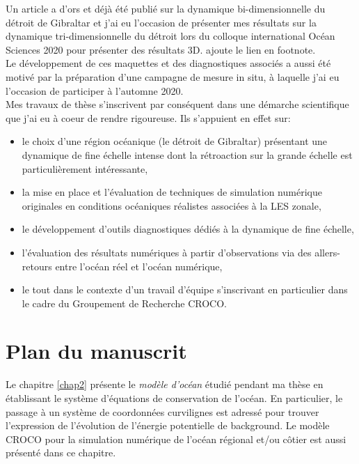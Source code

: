 Un article a d'ors et déjà été publié sur la dynamique bi-dimensionnelle du détroit de Gibraltar \citep{hilt_2020} et j'ai eu l'occasion de présenter mes résultats sur la dynamique tri-dimensionnelle du détroit lors du colloque international Océan Sciences 2020 pour présenter des résultats 3D.
\color{green} ajoute le lien en footnote.\color{black}\\

Le développement de ces maquettes et des diagnostiques associés a aussi été motivé par la préparation d'une campagne de mesure in situ, à laquelle j'ai eu l'occasion de participer à l'automne 2020. \\

\color{green}
Mes travaux de thèse s'inscrivent par conséquent dans une démarche scientifique que j'ai eu à coeur de rendre rigoureuse. Ils s'appuient en effet sur:
\begin{itemize}
    \item le choix d'une région océanique (le détroit de Gibraltar) présentant une dynamique de fine échelle intense dont la rétroaction sur la grande échelle est particulièrement intéressante,
    \item la mise en place et l'évaluation de techniques de simulation numérique originales en conditions océaniques réalistes associées à la LES zonale,
    \item le développement d'outils diagnostiques dédiés à la dynamique de fine échelle,
    \item l'évaluation des résultats numériques à partir d'observations via des allers-retours entre l'océan réel et l'océan numérique,
    \item le tout dans le contexte d'un travail d'équipe s'inscrivant en particulier dans le cadre du Groupement de Recherche CROCO.
\end{itemize}
\color{black}
\section{Plan du manuscrit}

Le chapitre \ref{chap2} présente le \textit{modèle d'océan} étudié pendant ma thèse en établissant le système d'équations de conservation de l'océan. En particulier, le passage à un système de coordonnées curvilignes est adressé pour trouver l'expression de l'évolution de l'énergie potentielle de background. Le modèle CROCO pour la simulation numérique de l'océan régional et/ou côtier est aussi présenté dans ce chapitre.

